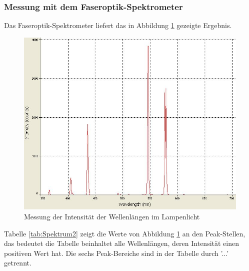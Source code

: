 \documentclass{scrartcl}
\begin{document}
\subsubsection{Messung mit dem Faseroptik-Spektrometer}
Das Faseroptik-Spektrometer liefert das in Abbildung \ref{fig:Spektrum} gezeigte Ergebnis.
\begin{figure}[H]
  \centering
    \includegraphics[scale=0.75]{Hg-Spektrum.JPG}
  \caption{Messung der Intensität der Wellenlängen im Lampenlicht}
  \label{fig:Spektrum}
\end{figure}
Tabelle \ref{tab:Spektrum2} zeigt die Werte von Abbildung \ref{fig:Spektrum} an den Peak-Stellen, das bedeutet die Tabelle beinhaltet alle Wellenlängen, deren Intensität einen positiven Wert hat. Die sechs Peak-Bereiche sind in der Tabelle durch '...' getrennt.
\end{document}
